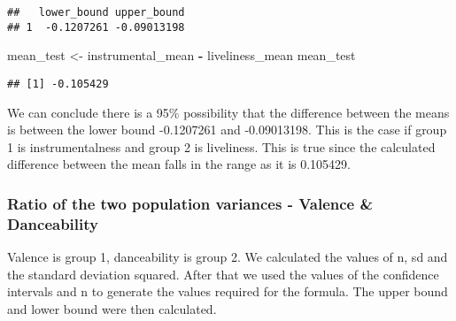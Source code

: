\documentclass[
]{article}
\newenvironment{Shaded}{\begin{snugshade}}{\end{snugshade}}
\newcommand{\NormalTok}[1]{#1}
\newcommand{\OperatorTok}[1]{\textcolor[rgb]{0.81,0.36,0.00}{\textbf{#1}}}
\newcommand{\StringTok}[1]{\textcolor[rgb]{0.31,0.60,0.02}{#1}}
\begin{document}
\begin{verbatim}
##   lower_bound upper_bound
## 1  -0.1207261 -0.09013198
\end{verbatim}

\begin{Shaded}
\begin{Highlighting}[]
\NormalTok{mean_test <-}\StringTok{ }\NormalTok{instrumental_mean }\OperatorTok{-}\StringTok{ }\NormalTok{liveliness_mean}
\NormalTok{mean_test}
\end{Highlighting}
\end{Shaded}

\begin{verbatim}
## [1] -0.105429
\end{verbatim}

We can conclude there is a 95\% possibility that the difference between
the means is between the lower bound -0.1207261 and -0.09013198. This is
the case if group 1 is instrumentalness and group 2 is liveliness. This
is true since the calculated difference between the mean falls in the
range as it is 0.105429.

\hypertarget{ratio-of-the-two-population-variances---valence-danceability}{%
\subsubsection{Ratio of the two population variances - Valence \&
Danceability}\label{ratio-of-the-two-population-variances---valence-danceability}}

Valence is group 1, danceability is group 2. We calculated the values of
n, sd and the standard deviation squared. After that we used the values
of the confidence intervals and n to generate the values required for
the formula. The upper bound and lower bound were then calculated.
\end{document}

